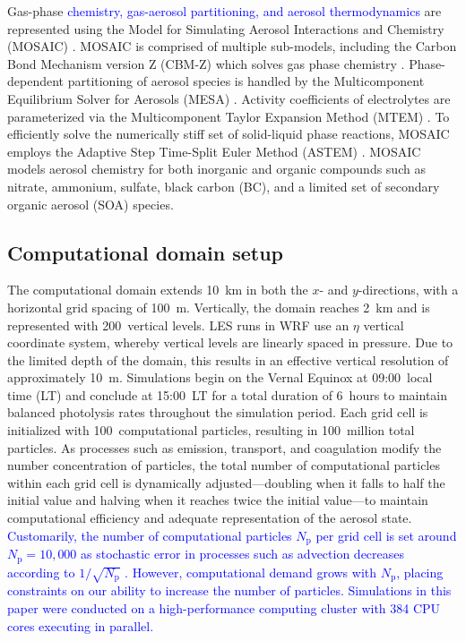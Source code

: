 \documentclass[journal abbreviation, manuscript]{copernicus}
\begin{document}
Gas-phase \textcolor{blue}{chemistry, gas-aerosol partitioning, and aerosol thermodynamics} 
are represented
using the Model for Simulating Aerosol Interactions and Chemistry
(MOSAIC) \citep{zaveri_model_2008}. MOSAIC is comprised of multiple
sub-models, including the Carbon Bond Mechanism version Z (CBM-Z)
which solves gas phase chemistry
\citep{zaveri_new_1999}. Phase-dependent partitioning of aerosol
species is handled by the Multicomponent Equilibrium Solver for
Aerosols (MESA) \citep{zaveri_computationally_2005}. Activity
coefficients of electrolytes are parameterized via the Multicomponent
Taylor Expansion Method (MTEM) \citep{zaveri_new_2005}. To efficiently
solve the numerically stiff set of solid-liquid phase reactions,
MOSAIC employs the Adaptive Step Time-Split Euler Method (ASTEM)
\citep{zaveri_model_2008}. MOSAIC models aerosol chemistry for both
inorganic and organic compounds such as nitrate, ammonium, sulfate,
black carbon (BC), and a limited set of secondary organic aerosol
(SOA) species.

\subsection{Computational domain setup}

The computational domain extends 10~km in both the $x$- and
$y$-directions, with a horizontal grid spacing of 100~m.  Vertically,
the domain reaches 2~km and is represented with 200~vertical
levels. LES runs in WRF use an $\eta$ vertical coordinate system,
whereby vertical levels are linearly spaced in pressure. Due to the
limited depth of the domain, this results in an effective vertical
resolution of approximately 10~m. Simulations begin on the Vernal
Equinox at 09:00~local time (LT) and conclude at 15:00~LT for a total
duration of 6~hours to maintain balanced photolysis rates throughout
the simulation period. Each grid cell is initialized with
100~computational particles, resulting in 100~million total
particles. As processes such as emission, transport, and coagulation
modify the number concentration of particles, the total number of
computational particles within each grid cell is dynamically
adjusted---doubling when it falls to half the initial value and
halving when it reaches twice the initial value---to maintain
computational efficiency and adequate representation of the aerosol
state. 
\textcolor{blue}{Customarily, the number of computational particles $N_{\mathrm{p}}$ per grid cell is set around $N_{\mathrm{p}} = 10,000$ as stochastic error in processes such as advection decreases according to $1/\sqrt{N_{\mathrm{p}}}$ \citep{gmd-17-8399-2024}. However, computational demand grows with $N_{\mathrm{p}}$, placing constraints on our ability to increase the number of particles. Simulations in this paper were conducted on a high-performance computing cluster with 384 CPU cores executing in parallel.}
\end{document}

